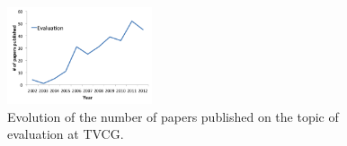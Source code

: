 

\begin{figure}
  \begin{center}
\includegraphics[width=0.38\textwidth]{chapter5/figures/evaluation_tvcg.png}
  \end{center}
  \caption{\label{fig:tvcg}Evolution of the number of papers published on the topic of evaluation at TVCG.}
\end{figure}
 
